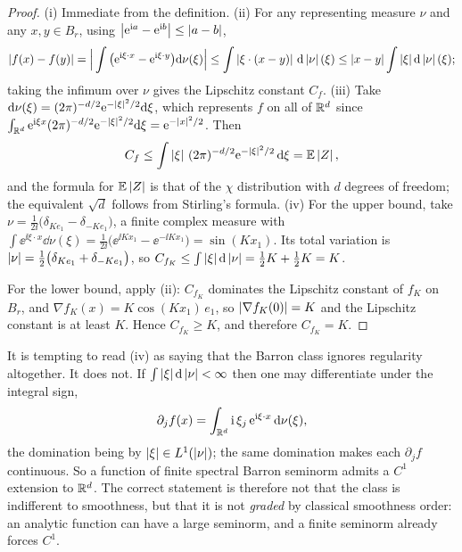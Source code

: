 \documentclass[11pt,a4paper]{article}
\begin{document}
\begin{proof}
(i) Immediate from the definition. (ii) For any representing measure $\nu$ and any $x,y \in B_r$, using
$\left\lvert \mathrm{e}^{\mathrm{i} a} - \mathrm{e}^{\mathrm{i} b} \right\rvert \le \left\lvert a-b \right\rvert$,
\[
\left\lvert f(x)-f(y) \right\rvert = \Big|\int \big(\mathrm{e}^{\mathrm{i} \xi\cdot x} - \mathrm{e}^{\mathrm{i} \xi\cdot y}\big)\mathrm{d}\nu(\xi)\Big|
\le \int \left\lvert \xi\cdot(x-y) \right\rvert\,\mathrm{d}\left\lvert \nu \right\rvert(\xi)
\le \left\lvert x-y \right\rvert \int\left\lvert \xi \right\rvert\mathrm{d}\left\lvert \nu \right\rvert(\xi) ;
\]
taking the infimum over $\nu$ gives the Lipschitz constant $C_f$.
(iii) Take $\mathrm{d}\nu(\xi) = (2\pi)^{-d/2}\mathrm{e}^{-\left\lvert \xi \right\rvert^2/2}\mathrm{d}\xi$, which represents $f$ on all
of $\mathbb{R}^d$ since
$\int_{\mathbb{R}^d} \mathrm{e}^{\mathrm{i} \xi x}(2\pi)^{-d/2}\mathrm{e}^{-\left\lvert \xi \right\rvert^2/2}\mathrm{d}\xi = \mathrm{e}^{-\left\lvert x \right\rvert^2/2}$. Then
\[
C_f \le \int \left\lvert \xi \right\rvert\, (2\pi)^{-d/2} \mathrm{e}^{-\left\lvert \xi \right\rvert^2/2}\,\mathrm{d}\xi = \mathbb{E}\left\lvert Z \right\rvert,
\]
and the formula for $\mathbb{E}\left\lvert Z \right\rvert$ is that of the $\chi$ distribution with $d$ degrees of freedom; the
equivalent $\sqrt d$ follows from Stirling's formula.
(iv) For the upper bound, take $\nu = \frac{1}{2\ii}\big(\delta_{Ke_1} - \delta_{-Ke_1}\big)$, a
finite complex measure with
$\int \ee^{\ii\xi\cdot x}\dd\nu(\xi) = \frac{1}{2\ii}\big(\ee^{\ii Kx_1} - \ee^{-\ii Kx_1}\big)
= \sin(Kx_1)$. Its total variation is
$\left\lvert \nu \right\rvert = \tfrac12\big(\delta_{Ke_1} + \delta_{-Ke_1}\big)$, so
$C_{f_K} \le \int\left\lvert \xi \right\rvert\mathrm{d}\left\lvert \nu \right\rvert = \tfrac12 K + \tfrac12 K = K$.

For the lower bound, apply (ii): $C_{f_K}$ dominates the Lipschitz constant of $f_K$ on $B_r$, and
$\nabla f_K(x) = K\cos(Kx_1)\,e_1$, so $\left\lvert \nabla f_K(0) \right\rvert = K$ and the Lipschitz constant is at
least $K$. Hence $C_{f_K} \ge K$, and therefore $C_{f_K} = K$.
\end{proof}

\begin{remark}\label{rem:barron-c1}
It is tempting to read (iv) as saying that the Barron class ignores regularity altogether. It does
not. If $\int\left\lvert \xi \right\rvert\mathrm{d}\left\lvert \nu \right\rvert < \infty$ then one may differentiate under the integral sign,
\[
\partial_j f(x) = \int_{\mathbb{R}^d} \mathrm{i}\, \xi_j\, \mathrm{e}^{\mathrm{i} \xi\cdot x}\, \mathrm{d}\nu(\xi),
\]
the domination being by $\left\lvert \xi \right\rvert \in L^1(\left\lvert \nu \right\rvert)$; the same domination makes each $\partial_j f$
continuous. So a function of finite spectral Barron seminorm admits a $C^1$ extension to $\mathbb{R}^d$. The
correct statement is therefore not that the class is indifferent to smoothness, but that it is not
\emph{graded} by classical smoothness order: an analytic function can have a large seminorm, and a
finite seminorm already forces $C^1$.
\end{remark}
\end{document}
